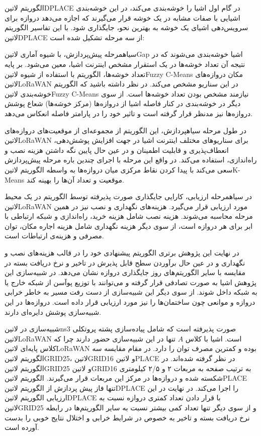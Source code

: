الگوریتم ‌لاتین{DPLACE} در گام اول اشیا را خوشه‌بندی می‌کند، در این خوشه‌بندی اشیایی با صفات مشابه در یک خوشه قرار می‌گیرند که اجازه می‌دهد
دروازه برای سرویس‌دهی اشیای یک خوشه به بهترین نحو، جایگذاری شود. با این تفاسیر الگوریتم ‌لاتین{DPLACE} از سه مرحله تشکیل شده است:


 ‌سیاه{مرحله پیش‌پردازش}، با شیوه آماری ‌لاتین{Gap} اشیا خوشه‌بندی می‌شوند که در نتیجه آن تعداد خوشه‌ها در یک استقرار مشخص اینترنت اشیا، معین می‌شود.
بر پایه تعداد خوشه‌ها، الگوریتم با استفاده از شیوه ‌لاتین{Fuzzy C-Means} مکان دروازه‌های ‌لاتین{LoRaWAN} در این سناریو مشخص می‌کند.
در نظر داشته باشید که الگوریتم خوشه‌بندی ‌لاتین{Fuzzy C-Means} نیازمند مشخص بودن تعداد خوشه‌ها است. از سوی دیگر در خوشه‌بندی در کنار فاصله اشیا
از دروازه‌ها (مرکز خوشه‌ها) شعاع پوشش دروازه‌ها نیز مدنظر قرار گرفته است و تاثیر خود را در پارامتر فاصله انعکاس می‌دهد.

 در طول مرحله ‌سیاه{پردازش}، این الگوریتم از مجموعه‌ای از موقعیت‌های دروازه‌های ‌لاتین{LoRaWAN} برای سناریوهای مختلف اینترنت اشیا
در جهت افزایش پوشش‌دهی، انعطاف‌پذیری و قابلیت اطمینان و در عین حال پایین نگه داشتن هزینه نصب و راه‌اندازی، استفاده می‌کند.
در واقع این مرحله با اجرای چندین باره مرحله پیش‌پردازش سعی می‌کند با پیدا کردن نقاط مرکزی میان دروازه‌ها
به واسطه الگوریتم ‌لاتین{K-Means} موقعیت و تعداد آن‌ها را بهینه کند.

 در ‌سیاه{مرحله ارزیابی}، کارایی جایگذاری صورت پذیرفته توسط الگوریتم در یک محیط ‌لاتین{LoRaWAN} مورد ارزیابی قرار می‌گیرد.
هزینه‌های نگهداری و نصب نیز در همین مرحله محاسبه می‌شوند. هزینه نصب شامل هزینه خرید، راه‌اندازی و شبکه ارتباطی با ابر برای هر دروازه
است، از سوی دیگر هزینه نگهداری شامل هزینه اجاره مکان، توان مصرفی و هزینه‌ی ارتباطات است.


در نهایت این پژوهش برتری الگوریتم پیشنهادی خود را در قالب هزینه‌های نصب و نگهداری و در عین حال برآوردن سطح قابل پذیرش در تاخیر و نرخ دریافت بسته
در مقایسه با سایر الگوریتم‌های روز جایگذاری دروازه نشان می‌دهد. در شبیه‌سازی این پژوهش اشیا به صورت تصادفی قرار گرفته و می‌توانند با توزیع پوآسن از شبکه خارج یا به شبکه داخل شوند.
از سوی دیگر این شبیه‌سازی از دست رفت مسیر به خاطر خرابی دروازه و موانعی چون ساختمان‌ها را نیز مورد ارزیابی قرار داده است.
دروازه‌ها در این شبیه‌سازی پوشش دایره‌ای دارند.

شبیه‌سازی در ‌لاتین{ns3} صورت پذیرفته است که شامل پیاده‌سازی پشته پروتکلی ‌لاتین{LoRaWAN} است.
اشیا با کلاس $A$ تنها در این شبیه‌سازی حضور دارند چرا که کلاس پایه‌ای ‌لاتین{LoRaWAN} بوده و کمترین مصرف توان را دارد.
در مقام مقایسه سه الگوریتم ‌لاتین{GRID25}، ‌لاتین{GRID16} و ‌لاتین{PLACE} در نظر گرفته شده‌اند.
در الگوریتم ‌لاتین{GRID25} و ‌لاتین{GRID16} به ترتیب صفحه به مربعات ۲ و ۲/۵ کیلومتری شکسته شده و دروازه‌ها
در مرکز این مربعات قرار می‌گیرند. الگوریتم ‌لاتین{PLACE} تنها فاز پیش پردازش از الگوریتم ‌لاتین{DPLACE} را اجرا می‌کند.
در نهایت در این ارزیابی الگوریتم ‌لاتین{DPLACE} با قرار دادن تعداد کمتری دروازه نسبت به ‌لاتین{GRID25}
و از سوی دیگر تنها تعداد کمی بیشتر نسبت به سایر الگوریتم‌ها در رابطه نرخ دریافت بسته و تاخیر به خصوص در شرایط خرابی و اختلال
نتایج خوبی را بدست آورده است.


